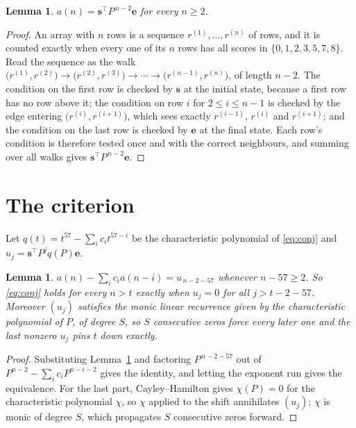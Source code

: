 \documentclass[11pt,a4paper]{article}
\theoremstyle{plain}
\newtheorem{lemma}[theorem]{Lemma}
\theoremstyle{definition}
\begin{document}
\begin{lemma}\label{lem:walk}
$a(n)=\mathbf{s}^{\!\top}P^{\,n-2}\mathbf{e}$ for every $n\ge2$.
\end{lemma}

\begin{proof}
An array with $n$ rows is a sequence $r^{(1)},\dots,r^{(n)}$ of rows, and it is counted
exactly when every one of its $n$ rows has all scores in $\{0,1,2,3,5,7,8\}$. Read the sequence as the
walk $\bigl(r^{(1)},r^{(2)}\bigr)\to\bigl(r^{(2)},r^{(3)}\bigr)\to\cdots\to
\bigl(r^{(n-1)},r^{(n)}\bigr)$, of length $n-2$. The condition on the first row is
checked by $\mathbf{s}$ at the initial state, because a first row has no row above it; the
condition on row $i$ for $2\le i\le n-1$ is checked by the edge entering
$\bigl(r^{(i)},r^{(i+1)}\bigr)$, which sees exactly $r^{(i-1)}$, $r^{(i)}$ and
$r^{(i+1)}$; and the condition on the last row is checked by $\mathbf{e}$ at the final
state. Each row's condition is therefore tested once and with the correct neighbours, and
summing over all walks gives $\mathbf{s}^{\!\top}P^{\,n-2}\mathbf{e}$.
\end{proof}

\section{The criterion}

Let $q(t)=t^{57}-\sum_i c_i t^{57-i}$ be the characteristic polynomial of
\eqref{eq:conj} and $u_j=\mathbf{s}^{\!\top}P^{j}q(P)\mathbf{e}$.

\begin{lemma}\label{lem:crit}
$a(n)-\sum_i c_i a(n-i)=u_{\,n-2-57}$ whenever $n-57\ge2$. So \eqref{eq:conj}
holds for every $n>t$ exactly when $u_j=0$ for all $j>t-2-57$. Moreover $(u_j)$
satisfies the monic linear recurrence given by the characteristic polynomial of $P$, of
degree $S$, so $S$ consecutive zeros force every later one and the last nonzero $u_j$ pins
$t$ down exactly.
\end{lemma}

\begin{proof}
Substituting Lemma~\ref{lem:walk} and factoring $P^{\,n-2-57}$ out of
$P^{n-2}-\sum_i c_i P^{n-i-2}$ gives the identity, and letting the exponent run gives the
equivalence. For the last part, Cayley--Hamilton gives $\chi(P)=0$ for the characteristic
polynomial $\chi$, so $\chi$ applied to the shift annihilates $(u_j)$; $\chi$ is monic of
degree $S$, which propagates $S$ consecutive zeros forward.
\end{proof}
\end{document}
